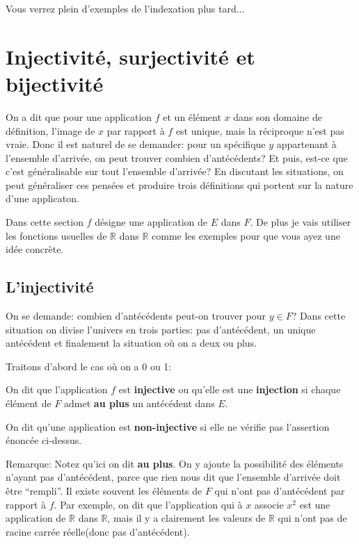 \documentclass{article}
\begin{document}
Vous verrez plein d'exemples de l'indexation plus tard...


\section{Injectivité, surjectivité et bijectivité}

On a dit que pour une application $f$ et un élément $x$ dans son domaine de définition, l'image de $x$ par rapport à $f$ est unique, mais la réciproque n'est pas vraie. Donc il est naturel de se demander: pour un spécifique $y$ appartenant à l'ensemble d'arrivée, on peut trouver combien d'antécédents? Et puis, est-ce que c'est généralisable sur tout l'ensemble d'arrivée? En discutant les situations, on peut généraliser ces pensées et produire trois définitions qui portent sur la nature d'une applicaton.

Dans cette section $f$ désigne une application de $E$ dans $F$. De plus je vais utiliser les fonctions usuelles de $\mathbb{R}$ dans $\mathbb{R}$ comme les exemples pour que vous ayez une idée concrète.

\subsection{L'injectivité}

On se demande: combien d'antécédents peut-on trouver pour $y \in F$? Dans cette situation on divise l'univers en trois parties: pas d'antécédent, un unique antécédent et finalement la situation où on a deux ou plus.

Traitons d'abord le cas où on a 0 ou 1:

\begin{tcolorbox}[colback=red!5!white,colframe=red!75!black,title=Définition 3.3]

On dit que l'application $f$ est \textbf{injective} ou qu'elle est une \textbf{injection} si chaque élément de $F$ admet \textbf{au plus} un antécédent dans $E$.

\tcblower

On dit qu'une application est \textbf{non-injective} si elle ne vérifie pas l'assertion énoncée ci-dessus.

\end{tcolorbox}

Remarque: Notez qu'ici on dit \textbf{au plus}. On y ajoute la possibilité des éléments n'ayant pas d'antécédent, parce que rien nous dit que l'ensemble d'arrivée doit être ``rempli''. Il existe souvent les éléments de $F$ qui n'ont pas d'antécédent par rapport à $f$. Par exemple, on dit que l'application qui à $x$ associe $x^{2}$ est une application de $\mathbb{R}$ dans $\mathbb{R}$, mais il y a clairement les valeurs de $\mathbb{R}$ qui n'ont pas de racine carrée réelle(donc pas d'antécédent).
\end{document}
